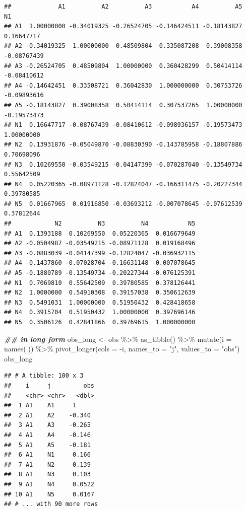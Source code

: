 \documentclass[
]{book}
\newenvironment{Shaded}{\begin{snugshade}}{\end{snugshade}}
\newcommand{\AttributeTok}[1]{\textcolor[rgb]{0.77,0.63,0.00}{#1}}
\newcommand{\DocumentationTok}[1]{\textcolor[rgb]{0.56,0.35,0.01}{\textbf{\textit{#1}}}}
\newcommand{\FunctionTok}[1]{\textcolor[rgb]{0.00,0.00,0.00}{#1}}
\newcommand{\NormalTok}[1]{#1}
\newcommand{\OtherTok}[1]{\textcolor[rgb]{0.56,0.35,0.01}{#1}}
\newcommand{\SpecialCharTok}[1]{\textcolor[rgb]{0.00,0.00,0.00}{#1}}
\newcommand{\StringTok}[1]{\textcolor[rgb]{0.31,0.60,0.02}{#1}}
\begin{document}
\begin{verbatim}
##             A1          A2          A3           A4          A5          N1
## A1  1.00000000 -0.34019325 -0.26524705 -0.146424511 -0.18143827  0.16647717
## A2 -0.34019325  1.00000000  0.48509804  0.335087208  0.39008358 -0.08767439
## A3 -0.26524705  0.48509804  1.00000000  0.360428299  0.50414114 -0.08410612
## A4 -0.14642451  0.33508721  0.36042830  1.000000000  0.30753726 -0.09893616
## A5 -0.18143827  0.39008358  0.50414114  0.307537265  1.00000000 -0.19573473
## N1  0.16647717 -0.08767439 -0.08410612 -0.098936157 -0.19573473  1.00000000
## N2  0.13931876 -0.05049870 -0.08830390 -0.143785958 -0.18807886  0.70698096
## N3  0.10269550 -0.03549215 -0.04147399 -0.070287040 -0.13549734  0.55642509
## N4  0.05220365 -0.08971128 -0.12824047 -0.166311475 -0.20227344  0.39780585
## N5  0.01667965  0.01916850 -0.03693212 -0.007078645 -0.07612539  0.37812644
##            N2          N3          N4           N5
## A1  0.1393188  0.10269550  0.05220365  0.016679649
## A2 -0.0504987 -0.03549215 -0.08971128  0.019168496
## A3 -0.0883039 -0.04147399 -0.12824047 -0.036932115
## A4 -0.1437860 -0.07028704 -0.16631148 -0.007078645
## A5 -0.1880789 -0.13549734 -0.20227344 -0.076125391
## N1  0.7069810  0.55642509  0.39780585  0.378126441
## N2  1.0000000  0.54910308  0.39157038  0.350612639
## N3  0.5491031  1.00000000  0.51950432  0.428418658
## N4  0.3915704  0.51950432  1.00000000  0.397696146
## N5  0.3506126  0.42841866  0.39769615  1.000000000
\end{verbatim}

\begin{Shaded}
\begin{Highlighting}[]
\DocumentationTok{\#\# in long form}
\NormalTok{obs\_long }\OtherTok{\textless{}{-}}\NormalTok{ obs }\SpecialCharTok{\%\textgreater{}\%} 
  \FunctionTok{as\_tibble}\NormalTok{() }\SpecialCharTok{\%\textgreater{}\%} 
  \FunctionTok{mutate}\NormalTok{(}\AttributeTok{i =} \FunctionTok{names}\NormalTok{(.)) }\SpecialCharTok{\%\textgreater{}\%} 
  \FunctionTok{pivot\_longer}\NormalTok{(}\AttributeTok{cols =} \SpecialCharTok{{-}}\NormalTok{i, }\AttributeTok{names\_to =} \StringTok{"j"}\NormalTok{, }\AttributeTok{values\_to =} \StringTok{"obs"}\NormalTok{)}
\NormalTok{obs\_long}
\end{Highlighting}
\end{Shaded}

\begin{verbatim}
## # A tibble: 100 x 3
##    i     j         obs
##    <chr> <chr>   <dbl>
##  1 A1    A1     1     
##  2 A1    A2    -0.340 
##  3 A1    A3    -0.265 
##  4 A1    A4    -0.146 
##  5 A1    A5    -0.181 
##  6 A1    N1     0.166 
##  7 A1    N2     0.139 
##  8 A1    N3     0.103 
##  9 A1    N4     0.0522
## 10 A1    N5     0.0167
## # ... with 90 more rows
\end{verbatim}
\end{document}
